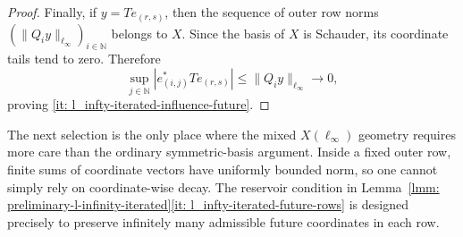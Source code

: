 \documentclass[11pt]{amsart}
\theoremstyle{plain}
\theoremstyle{definition}
\numberwithin{equation}{section}
\newcommand{\N}{\mathbb{N}}
\renewcommand{\leq}{\leqslant}
\begin{document}
\begin{proof}
    Finally, if $y=Te_{(r,s)}$, then the sequence of outer row norms $(\|Q_i y\|_{\ell_\infty})_{i\in\N}$ belongs to $X$. Since the basis of $X$ is Schauder, its coordinate tails tend to zero. Therefore
    \begin{equation*}
        \sup_{j\in\N}|e^*_{(i,j)}Te_{(r,s)}|\leq \|Q_i y\|_{\ell_\infty}\longrightarrow 0,
    \end{equation*}
    proving \ref{it: l_infty-iterated-influence-future}.
\end{proof}

The next selection is the only place where the mixed $X(\ell_\infty)$ geometry requires more care than the ordinary symmetric-basis argument.  Inside a fixed outer row, finite sums of coordinate vectors have uniformly bounded norm, so one cannot simply rely on coordinate-wise decay.  The reservoir condition in Lemma~\ref{lmm: preliminary-l-infinity-iterated}\ref{it: l_infty-iterated-future-rows} is designed precisely to preserve infinitely many admissible future coordinates in each row.
\end{document}
